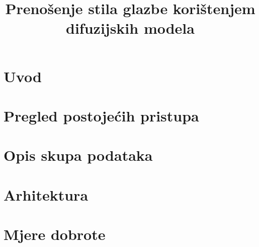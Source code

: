 \documentclass[conference]{IEEEtran}
\begin{document}
\title{Prenošenje stila glazbe korištenjem difuzijskih modela}


\author{
		\and
		\and
		\and
		\and
		\and
		}
	

\maketitle



\section{Uvod}


\section{Pregled postojećih pristupa}


\section{Opis skupa podataka}


\section{Arhitektura}



\section{Mjere dobrote}

\end{document}
